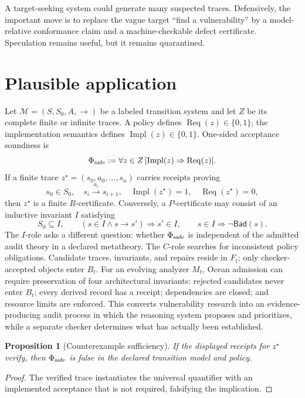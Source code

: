 \documentclass[11pt,oneside]{book}
\newtheorem{proposition}[theorem]{Proposition}
\theoremstyle{definition}
\theoremstyle{remark}
\newcommand{\Req}{\operatorname{Req}}
\newcommand{\Impl}{\operatorname{Impl}}
\begin{document}
A target-seeking system could generate many suspected traces. Defensively, the important move is to
replace the vague target ``find a vulnerability'' by a model-relative conformance claim and a
machine-checkable defect certificate. Speculation remains useful, but it remains quarantined.

\section{Plausible application}
Let \(\mathcal M=(S,S_0,A,\to)\) be a labeled transition system and let \(Z\) be its complete finite
or infinite traces. A policy defines \(\Req(z)\in\{0,1\}\); the implementation semantics defines
\(\Impl(z)\in\{0,1\}\). One-sided acceptance soundness is
\[
\Phi_{\rm safe}:=\forall z\in Z\,[\Impl(z)\Rightarrow\Req(z)].
\]
If a finite trace \(z^\star=(s_0,a_0,\ldots,s_n)\) carries receipts proving
\[
s_0\in S_0,\quad s_i\xrightarrow{a_i}s_{i+1},\quad
\Impl(z^\star)=1,\quad \Req(z^\star)=0,
\]
then \(z^\star\) is a finite \(R\)-certificate. Conversely, a \(P\)-certificate may consist of an
inductive invariant \(I\) satisfying
\[
S_0\subseteq I,\qquad
(s\in I\land s\to s')\Rightarrow s'\in I,
\qquad
s\in I\Rightarrow\neg\mathsf{Bad}(s).
\]
The \(I\)-role asks a different question: whether \(\Phi_{\rm safe}\) is independent of the admitted
audit theory in a declared metatheory. The \(C\)-role searches for inconsistent policy obligations.
Candidate traces, invariants, and repairs reside in \(F_t\); only checker-accepted objects enter \(B_t\).
For an evolving analyzer \(M_t\), Ocean admission can require preservation of four architectural
invariants: rejected candidates never enter \(B_t\); every derived record has a receipt; dependencies
are closed; and resource limits are enforced. This converts vulnerability research into an
evidence-producing audit process in which the reasoning system proposes and prioritizes, while a
separate checker determines what has actually been established.

\begin{proposition}[Counterexample sufficiency]
If the displayed receipts for \(z^\star\) verify, then \(\Phi_{\rm safe}\) is false in the declared
transition model and policy.
\end{proposition}

\begin{proof}
The verified trace instantiates the universal quantifier with an implemented acceptance that is not
required, falsifying the implication.
\end{proof}
\end{document}

